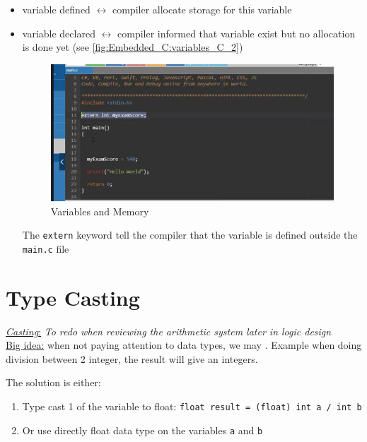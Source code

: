 \begin{itemize}
    \item variable defined $\leftrightarrow$ compiler allocate storage for this variable
    
    \item variable declared $\leftrightarrow$ compiler informed that variable exist but no allocation is done yet (see \autoref{fig:Embedded_C:variables_C_2})
    
    

\begin{figure}[h]
\centering
\includegraphics[scale=0.5]{Figures/Embedded_C/variables_C_2}
\caption{Variables and Memory}
\label{fig:Embedded_C:variables_C_2}
\end{figure}  

The \verb|extern| keyword tell the compiler that the variable is defined outside the \verb|main.c| file
    
\end{itemize}


\newpage

\section{Type Casting}

 \underline{\textit{Casting}:} \textit{To redo when reviewing the arithmetic system later in logic design}\\

\underline{Big idea:} when not paying attention to data types, we may . Example when doing division between 2 integer, the result will give an integers.

The solution is either:

\begin{enumerate}
    \item Type cast 1 of the variable to float: \verb|float result = (float) int a / int b|
    
    \item Or use directly float data type on the variables \verb|a| and \verb|b|
    
\end{enumerate}

